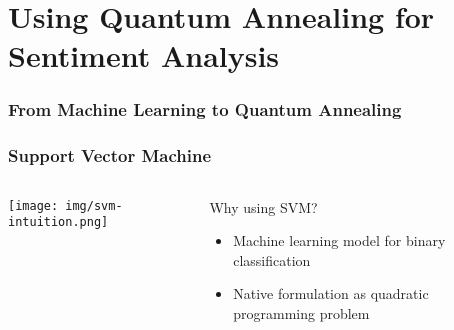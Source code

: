 \documentclass[aspectratio=169]{beamer}
\begin{document}
\section{Using Quantum Annealing for Sentiment Analysis}

\begin{frame}
    \frametitle{From Machine Learning to Quantum Annealing}
    
    \centering

\end{frame}

\begin{frame}
    \frametitle{Support Vector Machine}

    \begin{columns}
        \begin{column}{0.5\textwidth}
            \centering
            \texttt{[image: img/svm-intuition.png]}
        \end{column}
        \begin{column}{0.5\textwidth}
            Why using SVM?

            \begin{itemize}
                \item Machine learning model for binary classification 
                \item Native formulation as quadratic programming problem
            \end{itemize}
        \end{column}
        
    \end{columns}

\end{frame}
\end{document}
